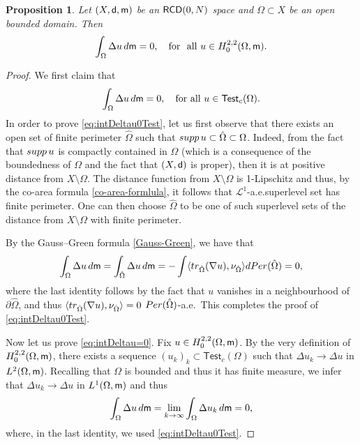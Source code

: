 \documentclass[11pt, reqno]{amsart}
\newtheorem{proposition}{Proposition}[section]
\numberwithin{equation}{section}
\begin{document}
	\begin{proposition}\label{prop-laplace=00} Let $(X,{\sf d},{\sf m})$ be an    ${\sf RCD}(0,N)$ space and $\Omega\subset X$ be an open bounded domain. Then  
		\begin{equation}\label{eq:intDeltau=0}
			\int_\Omega \Delta u\, {\rm d}{\sf m}=0,\ \ \ \text{for \ all}\ u\in H^{2,2}_0(\Omega, {\sf m}).
		\end{equation}
	\end{proposition}
	\begin{proof}
		We first claim that
		\begin{equation}\label{eq:intDeltau0Test}
			\int_\Omega \Delta u\, {\rm d}{\sf m}=0, \quad \text{for all } u\in \mathsf{Test}_c(\Omega). 
		\end{equation}
		In order to prove \eqref{eq:intDeltau0Test}, let us first observe that there exists an open set of finite perimeter $\hat{\Omega}$ such that ${\rm supp\,} u \subset \hat{\Omega} \subset \Omega$. Indeed, from the fact that ${\rm supp\,} u$ is compactly contained in $\Omega$ (which is a consequence of the boundedness of $\Omega$ and the fact that $(X,{\sf d})$ is proper), then it is at positive distance from $X\setminus \Omega$. The distance function from $X\setminus \Omega$ is 1-Lipschitz and thus, by the co-area formula  \eqref{co-area-formlula}, it follows that ${\mathcal L}^1$-a.e.\;superlevel set has finite perimeter. One can then choose $\hat{\Omega}$ to be one of such superlevel sets of the distance from $X\setminus \Omega$ with finite perimeter.
		
		By the Gauss--Green formula \eqref{Gauss-Green}, we have that
		\begin{equation*}
			\int_\Omega \Delta u\, {\rm d}{\sf m}= \int_{\hat{\Omega}}  \Delta u\, {\rm d}{\sf m}= -\int \langle {\rm tr}_{\hat{\Omega}}(\nabla u), \nu_{\hat{\Omega}} \rangle {\rm d}{\rm Per}(\hat{\Omega})=0, 
		\end{equation*}
		where the last identity follows by the fact that $u$ vanishes in a neighbourhood of $\partial \hat{\Omega}$, and thus  $\langle {\rm tr}_{\hat{\Omega}}(\nabla u), \nu_{\hat{\Omega}}\rangle=0$ ${\rm Per}(\hat{\Omega})$-a.e.\  This completes the proof of \eqref{eq:intDeltau0Test}.
		
		Now let us prove \eqref{eq:intDeltau=0}.
		Fix $u\in H^{2,2}_0(\Omega, {\sf m})$. By the very definition of $H^{2,2}_0(\Omega, {\sf m})$, there exists a sequence $(u_k)_k\subset \mathsf{Test}_c(\Omega)$ such that $\Delta u_k\to \Delta u$ in $L^2(\Omega, {\sf m})$. Recalling that $\Omega$ is bounded and thus it has finite measure, we infer that $\Delta u_k\to \Delta u$ in $L^1(\Omega, {\sf m})$ and thus
		$$
		\int_\Omega \Delta u\, {\rm d}{\sf m}=\lim_{k\to \infty} \int_\Omega \Delta u_k\, {\rm d}{\sf m}=0,
		$$
		where, in the last identity, we used \eqref{eq:intDeltau0Test}. 
	\end{proof}
	
\end{document}
